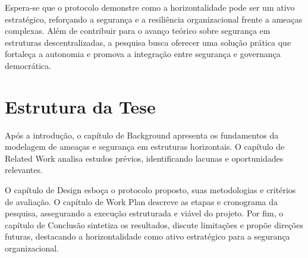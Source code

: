 Espera-se que o protocolo demonstre como a horizontalidade pode ser um ativo
estratégico, reforçando a segurança e a resiliência organizacional frente a
ameaças complexas. Além de contribuir para o avanço teórico sobre segurança em
estruturas descentralizadas, a pesquisa busca oferecer uma solução prática que
fortaleça a autonomia e promova a integração entre segurança e governança
democrática.

\section{Estrutura da Tese} 
\label{sec:estrutura_tese}

Após a introdução, o capítulo de Background apresenta os fundamentos
da modelagem de ameaças e segurança em estruturas horizontais. O
capítulo de Related Work analisa estudos prévios, identificando
lacunas e oportunidades relevantes.

O capítulo de Design esboça o protocolo proposto, suas metodologias e
critérios de avaliação. O capítulo de Work Plan descreve as etapas e
cronograma da pesquisa, assegurando a execução estruturada e viável do
projeto. Por fim, o capítulo de Conclusão sintetiza os resultados,
discute limitações e propõe direções futuras, destacando a
horizontalidade como ativo estratégico para a segurança
organizacional.